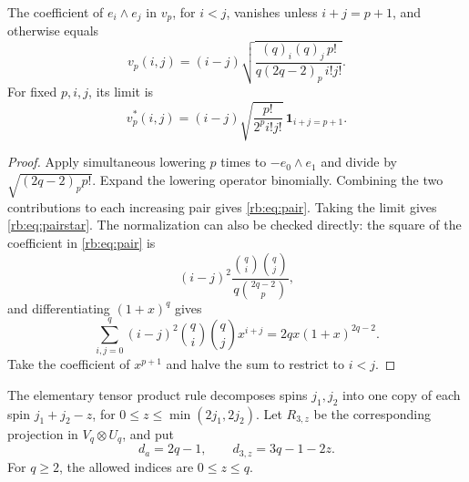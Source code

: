 \begin{lemma}\label{rb:lem:pair}
The coefficient of $e_i\wedge e_j$ in $v_p$, for $i<j$, vanishes unless $i+j=p+1$, and otherwise equals
\begin{equation}\label{rb:eq:pair}
 v_p(i,j)=(i-j)\sqrt{\frac{(q)_i(q)_j\,p!}{q(2q-2)_p\,i!j!}}.
\end{equation}
For fixed $p,i,j$, its limit is
\begin{equation}\label{rb:eq:pairstar}
 v_p^*(i,j)=(i-j)\sqrt{\frac{p!}{2^p i!j!}}\,\mathbf1_{i+j=p+1}.
\end{equation}
\end{lemma}
\begin{proof}
Apply simultaneous lowering $p$ times to $-e_0\wedge e_1$ and divide by $\sqrt{(2q-2)_p p!}$. Expand the lowering operator binomially. Combining the two contributions to each increasing pair gives \eqref{rb:eq:pair}. Taking the limit gives \eqref{rb:eq:pairstar}.
The normalization can also be checked directly: the square of the
coefficient in \eqref{rb:eq:pair} is
\[
 (i-j)^2\frac{\binom qi\binom qj}{q\binom{2q-2}{p}},
\]
and differentiating \((1+x)^q\) gives
\[
 \sum_{i,j=0}^q(i-j)^2\binom qi\binom qj x^{i+j}
 =2qx(1+x)^{2q-2}.
\]
Take the coefficient of \(x^{p+1}\) and halve the sum to restrict to \(i<j\).
\end{proof}

The elementary tensor product rule decomposes spins $j_1,j_2$ into one copy of each spin $j_1+j_2-z$, for $0\le z\le\min(2j_1,2j_2)$. Let $R_{3,z}$ be the corresponding projection in $V_q\otimes U_q$, and put
\[
 d_a=2q-1,\qquad d_{3,z}=3q-1-2z.
\]
For $q\ge2$, the allowed indices are $0\le z\le q$.

